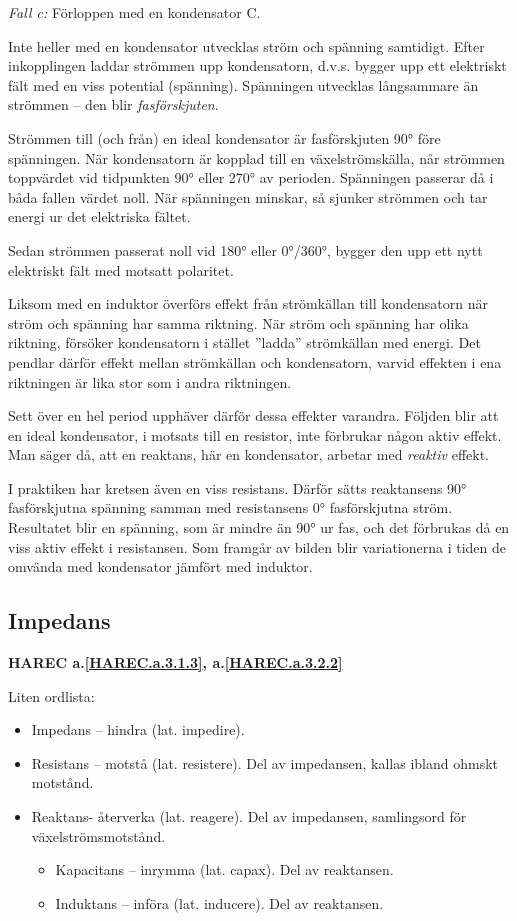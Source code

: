 \emph{Fall c:} Förloppen med en kondensator C.

Inte heller med en kondensator utvecklas ström och spänning samtidigt. Efter
inkopplingen laddar strömmen upp kondensatorn, d.v.s. bygger upp ett elektriskt
fält med en viss potential (spänning). Spänningen utvecklas långsammare än
strömmen -- den blir \emph{fasförskjuten}.

Strömmen till (och från) en ideal kondensator är fasförskjuten 90° före
spänningen. När kondensatorn är kopplad till en växelströmskälla, når strömmen
toppvärdet vid tidpunkten 90° eller 270° av perioden. Spänningen passerar då i
båda fallen värdet noll. När spänningen minskar, så sjunker strömmen och tar
energi ur det elektriska fältet.

Sedan strömmen passerat noll vid 180° eller 0°/360°, bygger den upp ett nytt
elektriskt fält med motsatt polaritet.

Liksom med en induktor överförs effekt från strömkällan till kondensatorn när
ström och spänning har samma riktning. När ström och spänning har olika
riktning, försöker kondensatorn i stället ''ladda'' strömkällan med energi. Det
pendlar därför effekt mellan strömkällan och kondensatorn, varvid effekten i
ena riktningen är lika stor som i andra riktningen.

Sett över en hel period upphäver därför dessa effekter varandra. Följden blir
att en ideal kondensator, i motsats till en resistor, inte förbrukar någon
aktiv effekt. Man säger då, att en reaktans, här en kondensator, arbetar med
\emph{reaktiv} effekt.

I praktiken har kretsen även en viss resistans. Därför sätts reaktansens 90°
fasförskjutna spänning samman med resistansens 0° fasförskjutna ström.
Resultatet blir en spänning, som är mindre än 90° ur fas, och det förbrukas då
en viss aktiv effekt i resistansen. Som framgår av bilden blir variationerna i
tiden de omvända med kondensator jämfört med induktor.

\subsection{Impedans}
\textbf{HAREC
  a.\ref{HAREC.a.3.1.3}\label{myHAREC.a.3.1.3c},
  a.\ref{HAREC.a.3.2.2}\label{myHAREC.a.3.2.2}
}

Liten ordlista:
\begin{itemize}
\item Impedans -- hindra (lat. impedire).
\item Resistans -- motstå (lat. resistere).
  Del av impedansen, kallas ibland ohmskt motstånd.
\item Reaktans- återverka (lat. reagere).
  Del av impedansen, samlingsord för växelströmsmotstånd.
  \begin{itemize}
  \item Kapacitans -- inrymma (lat. capax). Del av reaktansen.
  \item Induktans -- införa (lat. inducere). Del av reaktansen.
  \end{itemize}
\end{itemize}

